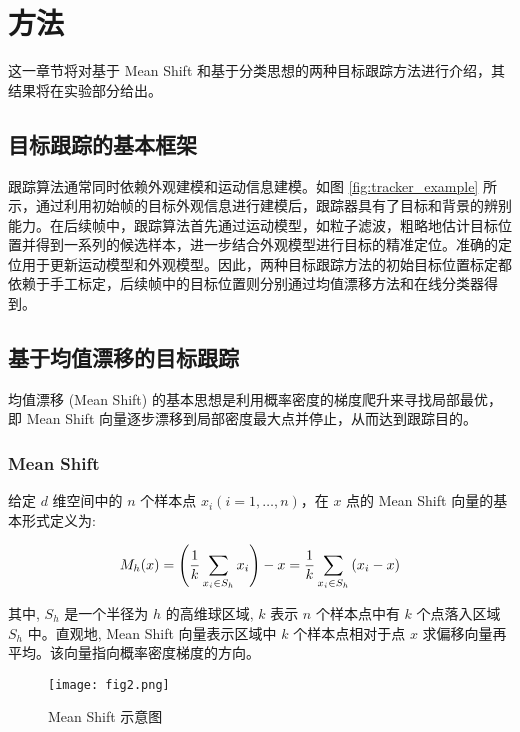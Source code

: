 \section{方法} 
\label{sec:proposed}

这一章节将对基于 Mean Shift 和基于分类思想的两种目标跟踪方法进行介绍，其结果将在实验部分给出。

\subsection{目标跟踪的基本框架}

跟踪算法通常同时依赖外观建模和运动信息建模。如图 \ref{fig:tracker_example} 所示，通过利用初始帧的目标外观信息进行建模后，跟踪器具有了目标和背景的辨别能力。在后续帧中，跟踪算法首先通过运动模型，如粒子滤波，粗略地估计目标位置并得到一系列的候选样本，进一步结合外观模型进行目标的精准定位。准确的定位用于更新运动模型和外观模型。因此，两种目标跟踪方法的初始目标位置标定都依赖于手工标定，后续帧中的目标位置则分别通过均值漂移方法和在线分类器得到。

\subsection{基于均值漂移的目标跟踪}

均值漂移 (Mean Shift) 的基本思想是利用概率密度的梯度爬升来寻找局部最优，即 Mean Shift 向量逐步漂移到局部密度最大点并停止，从而达到跟踪目的。

\subsubsection{Mean Shift}

给定 $d$ 维空间中的 $n$ 个样本点 $x_i(i=1, \ldots, n)$，在 $x$ 点的 Mean Shift 向量的基本形式定义为:
\vspace{0.5cm}

\begin{equation}
M_h(x)=\left(\frac{1}{k} \sum_{x_i \in S_h} x_i\right)-x=\frac{1}{k} \sum_{x_i \in S_h}\left(x_i-x\right)
\vspace{0.5cm}
\end{equation}

其中, $S_h$ 是一个半径为 $h$ 的高维球区域, $k$ 表示 $n$ 个样本点中有 $k$ 个点落入区域 $S_h$ 中。直观地, Mean Shift 向量表示区域中 $k$ 个样本点相对于点 $x$ 求偏移向量再平均。该向量指向概率密度梯度的方向。

\begin{figure}[!ht]
	\center
	\texttt{[image: fig2.png]}
	\caption{Mean Shift 示意图}
	\label{fig:meanshift}
\end{figure}

